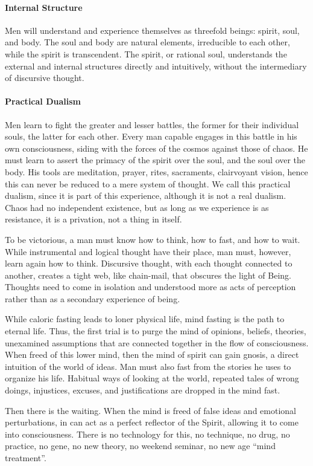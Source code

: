 \paragraph{Internal Structure}
Men will understand and experience themselves as threefold beings: spirit, soul, and body. The soul and body are natural elements, irreducible to each other, while the spirit is transcendent. The spirit, or rational soul, understands the external and internal structures directly and intuitively, without the intermediary of discursive thought.

\paragraph{Practical Dualism}
Men learn to fight the greater and lesser battles, the former for their individual souls, the latter for each other. Every man capable engages in this battle in his own consciousness, siding with the forces of the cosmos against those of chaos. He must learn to assert the primacy of the spirit over the soul, and the soul over the body. His tools are meditation, prayer, rites, sacraments, clairvoyant vision, hence this can never be reduced to a mere system of thought. We call this practical dualism, since it is part of this experience, although it is not a real dualism. Chaos had no independent existence, but as long as we experience is as resistance, it is a privation, not a thing in itself.

To be victorious, a man must know how to think, how to fast, and how to wait. While instrumental and logical thought have their place, man must, however, learn again how to think. Discursive thought, with each thought connected to another, creates a tight web, like chain-mail, that obscures the light of Being. Thoughts need to come in isolation and understood more as acts of perception rather than as a secondary experience of being.

While caloric fasting leads to loner physical life, mind fasting is the path to eternal life. Thus, the first trial is to purge the mind of opinions, beliefs, theories, unexamined assumptions that are connected together in the flow of consciousness. When freed of this lower mind, then the mind of spirit can gain gnosis, a direct intuition of the world of ideas. Man must also fast from the stories he uses to organize his life. Habitual ways of looking at the world, repeated tales of wrong doings, injustices, excuses, and justifications are dropped in the mind fast.

Then there is the waiting. When the mind is freed of false ideas and emotional perturbations, in can act as a perfect reflector of the Spirit, allowing it to come into consciousness. There is no technology for this, no technique, no drug, no practice, no gene, no new theory, no weekend seminar, no new age “mind treatment”.

